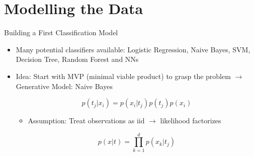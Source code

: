 \documentclass{beamer}
\begin{document}
\section{Modelling the Data}




\begin{frame}{Building a First Classification Model}

\begin{itemize}
	\item Many potential classifiers available: Logistic Regression, Naive Bayes, SVM,
Decision Tree, Random Forest and NNs
	\item Idea: Start with MVP (minimal viable product) to grasp the problem $\to$ Generative Model: Naive Bayes
	
	$$ p(t_j|x_i) = p(x_i|t_j) p(t_j) p(x_i)$$
	
	\begin{itemize}
		\item Assumption: Treat observations as iid $\to$ likelihood factorizes
	\end{itemize}
	
	
	$$p(x|t) = \prod_{k=1}^d p(x_k|t_j)$$

\end{itemize}
\end{frame}
\end{document}

